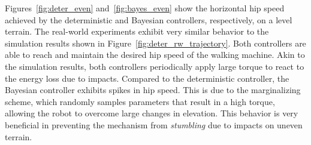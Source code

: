 Figures~\ref{fig:deter_even} and~\ref{fig:bayes_even} show the horizontal hip
speed achieved by the deterministic and Bayesian controllers, respectively, on
a level terrain.
%
The real-world experiments exhibit very similar behavior to the simulation
results shown in Figure~\ref{fig:deter_rw_trajectory}.
%
Both controllers are able to reach and maintain the desired hip speed of the
walking machine.
%
Akin to the simulation results, both controllers periodically apply large torque
to react to the energy loss due to impacts.
%
Compared to the deterministic controller, the Bayesian controller exhibits spikes
in hip speed.
%
This is due to the marginalizing scheme, which randomly samples parameters that
result in a high torque, allowing the robot to overcome large changes in elevation.
%
This behavior is very beneficial in preventing the mechanism from
\textit{stumbling} due to impacts on uneven terrain. 
%
%

